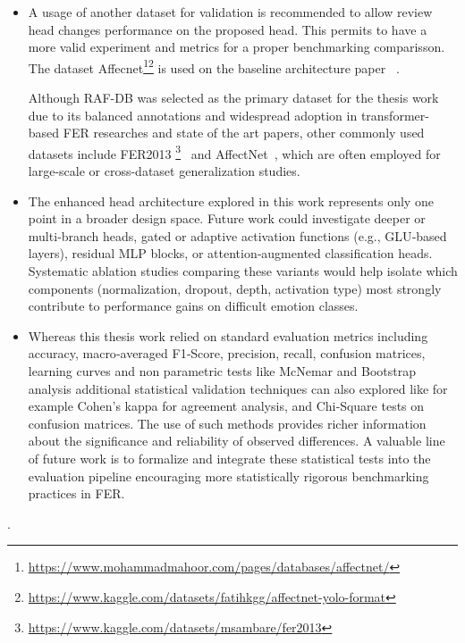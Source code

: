 \begin{itemize}
\item A usage of another dataset for validation is recommended to allow review head changes performance on the proposed head. This permits to have a more valid experiment and metrics for a proper benchmarking comparisson. The dataset Affecnet\footnote{\url{https://www.mohammadmahoor.com/pages/databases/affectnet/}}\footnote{\url{https://www.kaggle.com/datasets/fatihkgg/affectnet-yolo-format}} is used on the baseline architecture paper ~\cite{zheng_poster_2022}. 

Although RAF-DB was selected as the primary dataset for the thesis work due to its balanced annotations and widespread adoption in transformer-based \gls{FER} researches and state of the art papers, other commonly used datasets include FER2013 \footnote{\url{https://www.kaggle.com/datasets/msambare/fer2013}}~\cite{khaireddin_facial_2021} and AffectNet~\cite{mollahosseini_affectnet_2019}, which are often employed for large-scale or cross-dataset generalization studies.

\item  The enhanced head architecture explored in this work represents only one point in a broader design space. Future work could investigate deeper or multi‑branch heads, gated or adaptive activation functions (e.g., GLU‑based layers), residual MLP blocks, or attention‑augmented classification heads. Systematic ablation studies comparing these variants would help isolate which components (normalization, dropout, depth, activation type) most strongly contribute to performance gains on difficult emotion classes.

\item Whereas this thesis work relied on standard evaluation metrics including accuracy, macro‑averaged F1‑Score, precision, recall, confusion matrices, learning curves and non parametric tests like McNemar and Bootstrap  analysis  additional statistical validation techniques can also explored like for example Cohen’s kappa for agreement analysis, and Chi‑Square tests on confusion matrices. The use of such methods provides richer information about the significance and reliability of observed differences. A valuable line of future work is to formalize and integrate these statistical tests into the evaluation pipeline encouraging more statistically rigorous benchmarking practices in \gls{FER}.
\end{itemize}. 



%	
%	
%	
